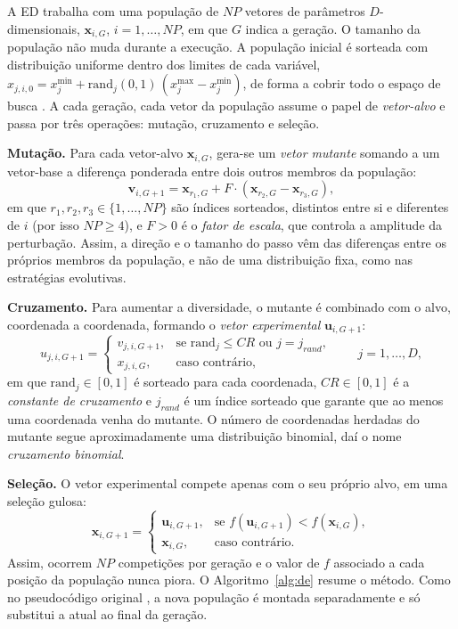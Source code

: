 \documentclass[12pt]{article}
\newcommand{\x}{\mathbf{x}}
\newcommand{\vv}{\mathbf{v}}
\newcommand{\uu}{\mathbf{u}}
\begin{document}
A ED trabalha com uma população de $NP$ vetores de parâmetros
$D$-dimensionais, $\x_{i,G}$, $i = 1, \dots, NP$, em que $G$ indica a geração.
O tamanho da população não muda durante a execução. A população inicial é
sorteada com distribuição uniforme dentro dos limites de cada variável,
$x_{j,i,0} = x_j^{\min} + \mathrm{rand}_j(0,1)\,(x_j^{\max} - x_j^{\min})$,
de forma a cobrir todo o espaço de busca \cite{storn1997,baeldung}. A cada
geração, cada vetor da população assume o papel de \emph{vetor-alvo} e passa
por três operações: mutação, cruzamento e seleção.

\textbf{Mutação.} Para cada vetor-alvo $\x_{i,G}$, gera-se um \emph{vetor
mutante} somando a um vetor-base a diferença ponderada entre dois outros
membros da população:
\begin{equation}
  \vv_{i,G+1} = \x_{r_1,G} + F \cdot \left(\x_{r_2,G} - \x_{r_3,G}\right),
  \label{eq:mutacao}
\end{equation}
em que $r_1, r_2, r_3 \in \{1, \dots, NP\}$ são índices sorteados, distintos
entre si e diferentes de $i$ (por isso $NP \ge 4$), e $F > 0$ é o
\emph{fator de escala}, que controla a amplitude da perturbação. Assim, a
direção e o tamanho do passo vêm das diferenças entre os próprios membros da
população, e não de uma distribuição fixa, como nas estratégias evolutivas.

\textbf{Cruzamento.} Para aumentar a diversidade, o mutante é combinado com o
alvo, coordenada a coordenada, formando o \emph{vetor experimental}
$\uu_{i,G+1}$:
\begin{equation}
  u_{j,i,G+1} =
  \begin{cases}
    v_{j,i,G+1}, & \text{se } \mathrm{rand}_j \le CR \text{ ou } j = j_{rand},\\
    x_{j,i,G},   & \text{caso contrário},
  \end{cases}
  \qquad j = 1, \dots, D,
  \label{eq:cruzamento}
\end{equation}
em que $\mathrm{rand}_j \in [0,1]$ é sorteado para cada coordenada,
$CR \in [0,1]$ é a \emph{constante de cruzamento} e $j_{rand}$ é um índice
sorteado que garante que ao menos uma coordenada venha do mutante. O número de
coordenadas herdadas do mutante segue aproximadamente uma distribuição
binomial, daí o nome \emph{cruzamento binomial}.

\textbf{Seleção.} O vetor experimental compete apenas com o seu próprio alvo,
em uma seleção gulosa:
\begin{equation}
  \x_{i,G+1} =
  \begin{cases}
    \uu_{i,G+1}, & \text{se } f(\uu_{i,G+1}) < f(\x_{i,G}),\\
    \x_{i,G},    & \text{caso contrário}.
  \end{cases}
  \label{eq:selecao}
\end{equation}
Assim, ocorrem $NP$ competições por geração e o valor de $f$ associado a cada
posição da população nunca piora. O Algoritmo~\ref{alg:de} resume o método.
Como no pseudocódigo original \cite{storn1997}, a nova população é montada
separadamente e só substitui a atual ao final da geração.
\end{document}
